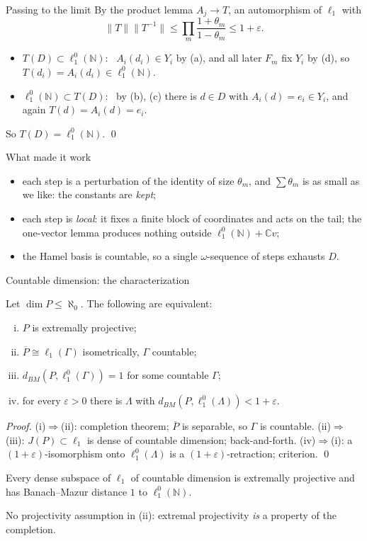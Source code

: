 \documentclass[10pt,aspectratio=169]{beamer}
\newcommand{\lo}[1]{\ell_1^0(#1)}
\newcommand{\ellone}[1]{\ell_1(#1)}
\newcommand{\BM}{d_{BM}}
\newcommand{\NN}{\mathbb N}
\newcommand{\CC}{\mathbb C}
\begin{document}
\begin{frame}{Passing to the limit}
  By the product lemma $A_j\to T$, an automorphism of $\ell_1$ with
  \[
    \|T\|\|T^{-1}\|\le\prod_m\frac{1+\theta_m}{1-\theta_m}\le1+\varepsilon .
  \]
  \begin{itemize}
    \item $T(D)\subset\lo\NN$: \ $A_i(d_i)\in Y_i$ by (a), and all later $F_m$
      fix $Y_i$ by (d), so $T(d_i)=A_i(d_i)\in\lo\NN$.
    \item $\lo\NN\subset T(D)$: \ by (b), (c) there is $d\in D$ with
      $A_i(d)=e_i\in Y_i$, and again $T(d)=A_i(d)=e_i$.
  \end{itemize}
  So $T(D)=\lo\NN$. \qed
  \begin{alertblock}{What made it work}
    \begin{itemize}
      \item each step is a perturbation of the identity of size $\theta_m$, and
        $\sum\theta_m$ is as small as we like: the constants are \emph{kept};
      \item each step is \emph{local}: it fixes a finite block of coordinates and
        acts on the tail; the one-vector lemma produces nothing outside
        $\lo\NN+\CC v$;
      \item the Hamel basis is countable, so a single $\omega$-sequence of steps
        exhausts $D$.
    \end{itemize}
  \end{alertblock}
\end{frame}

\begin{frame}{Countable dimension: the characterization}
  \begin{theorem}
    Let $\dim P\le\aleph_0$. The following are equivalent:
    \begin{enumerate}[(i)]
      \item $P$ is extremally projective;
      \item $\overline P\cong\ellone\Gamma$ isometrically, $\Gamma$ countable;
      \item $\BM(P,\lo\Gamma)=1$ for some countable $\Gamma$;
      \item for every $\varepsilon>0$ there is $\Lambda$ with $\BM(P,\lo\Lambda)<1+\varepsilon$.
    \end{enumerate}
  \end{theorem}
  \textit{Proof.} (i)$\Rightarrow$(ii): completion theorem; $\overline P$ is
  separable, so $\Gamma$ is countable.
  (ii)$\Rightarrow$(iii): $J(P)\subset\ell_1$ is dense of countable dimension;
  back-and-forth.
  (iv)$\Rightarrow$(i): a $(1+\varepsilon)$-isomorphism onto $\lo\Lambda$ is a
  $(1+\varepsilon)$-retraction; criterion. \qed
  \begin{corollary}
    Every dense subspace of $\ell_1$ of countable dimension is extremally
    projective and has Banach--Mazur distance $1$ to $\lo\NN$.
  \end{corollary}
  No projectivity assumption in (ii): extremal projectivity \emph{is} a
  property of the completion.
\end{frame}
\end{document}
